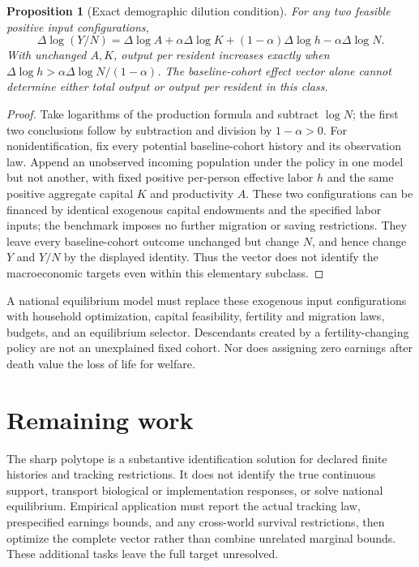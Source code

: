 \documentclass[11pt]{article}
\newtheorem{proposition}[theorem]{Proposition}
\theoremstyle{remark}
\begin{document}
\begin{proposition}[Exact demographic dilution condition]
For any two feasible positive input configurations,
\[
 \Delta\log(Y/N)=\Delta\log A+\alpha\Delta\log K
                    +(1-\alpha)\Delta\log h-\alpha\Delta\log N.
\]
With unchanged $A,K$, output per resident increases exactly when
$\Delta\log h>\alpha\Delta\log N/(1-\alpha)$. The baseline-cohort effect vector alone cannot determine either total output or output per resident in this class.
\end{proposition}
\begin{proof}
Take logarithms of the production formula and subtract $\log N$; the first two conclusions follow by subtraction and division by $1-\alpha>0$. For nonidentification, fix every potential baseline-cohort history and its observation law. Append an unobserved incoming population under the policy in one model but not another, with fixed positive per-person effective labor $h$ and the same positive aggregate capital $K$ and productivity $A$. These two configurations can be financed by identical exogenous capital endowments and the specified labor inputs; the benchmark imposes no further migration or saving restrictions. They leave every baseline-cohort outcome unchanged but change $N$, and hence change $Y$ and $Y/N$ by the displayed identity. Thus the vector does not identify the macroeconomic targets even within this elementary subclass.
\end{proof}

A national equilibrium model must replace these exogenous input configurations with household optimization, capital feasibility, fertility and migration laws, budgets, and an equilibrium selector. Descendants created by a fertility-changing policy are not an unexplained fixed cohort. Nor does assigning zero earnings after death value the loss of life for welfare.

\section{Remaining work}
The sharp polytope is a substantive identification solution for declared finite histories and tracking restrictions. It does not identify the true continuous support, transport biological or implementation responses, or solve national equilibrium. Empirical application must report the actual tracking law, prespecified earnings bounds, and any cross-world survival restrictions, then optimize the complete vector rather than combine unrelated marginal bounds. These additional tasks leave the full target unresolved.
\end{document}
